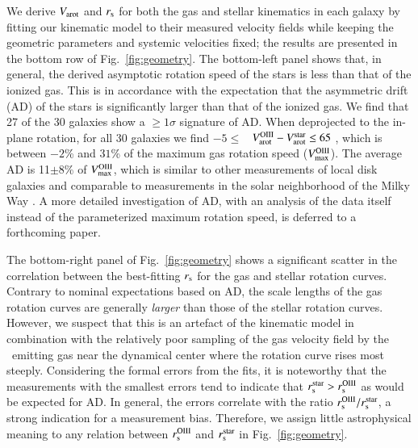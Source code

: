 \documentclass[traditabstract]{aa} %
\begin{document}
We derive $V_{\rm arot}$ and $r_{\rm s}$ for both the gas and stellar kinematics in each
galaxy by fitting our kinematic model to their measured velocity fields while
keeping the geometric parameters and systemic velocities fixed; the results are
presented in the bottom row of Fig.~\ref{fig:geometry}.  The bottom-left panel
shows that, in general, the derived asymptotic rotation speed of the stars is
less than that of the ionized gas.  This is in accordance with the expectation
that the asymmetric drift (AD) of the stars is significantly larger than that of
the ionized gas. We find that 27 of the 30 galaxies show a $\geq 1\sigma$
signature of AD.  When deprojected to the in-plane rotation, for all 30 galaxies
we find $-5 \leq$ \kms\ $V_{\rm arot}^{\rm OIII}-V_{\rm arot}^{\rm star} \leq 65$ \kms, which
is between $-2$\% and $31$\% of the maximum gas rotation speed ($V_{\rm max}^{\rm OIII}$).
The average AD is 11$\pm$8\% of $V_{\rm max}^{\rm OIII}$, which is similar
to other measurements of local disk galaxies \citep[e.g.][]{ciardullo2004,
herrmann2009} and comparable to measurements in the solar neighborhood of the
Milky Way \citep[e.g.][]{ratnatunga1997, olling2003}.  A more detailed
investigation of AD, with an analysis of the data itself instead of
the parameterized maximum rotation speed, is deferred to a forthcoming paper.

The bottom-right panel of Fig.~\ref{fig:geometry} shows a significant scatter
in the correlation between the best-fitting $r_{\rm s}$ for the gas and stellar
rotation curves.  Contrary to nominal expectations based on AD, the scale
lengths of the gas rotation curves are generally {\it larger} than those of the
stellar rotation curves.  However, we suspect that this is an artefact of the
kinematic model in combination with the relatively poor sampling of the gas
velocity field by the \oiii\ emitting gas near the dynamical center where the
rotation curve rises most steeply. Considering the formal errors from the fits,
it is noteworthy that the measurements with the smallest errors tend to indicate
that $r_{\rm s}^{\rm star}>r_{\rm s}^{\rm OIII}$ as would be expected for AD.  In general,
the errors correlate with the ratio $r_{\rm s}^{\rm OIII} / r_{\rm s}^{\rm star}$, a strong
indication for a measurement bias.  Therefore, we assign little astrophysical
meaning to any relation between $r_{\rm s}^{\rm OIII}$ and $r_{\rm s}^{\rm star}$ in
Fig.~\ref{fig:geometry}.
\end{document}
